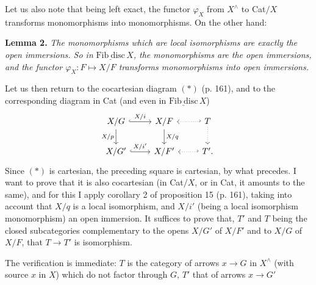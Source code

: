 \documentclass[11pt]{article}
\newcommand{\msp}[1]{\marginpar{\footnotesize [#1]}}
\newcommand{\Fibdisc}{\underline{\mathrm{Fib\ disc}}}
\begin{document}
\msp{page 165}
Let us also note that being left exact, the functor $\varphi_X$ from $X^{\wedge}$ to Cat$/X$ transforms monomorphisms into monomorphisms. On the other hand:

\textbf{Lemma 2.} \textit{The monomorphisms which are local isomorphisms are exactly the open immersions. So in} $\Fibdisc\, X$\textit{, the monomorphisms are the open immersions, and the functor $\varphi_X : F \longmapsto X/F$ transforms monomorphisms into open immersions.}

Let us then return to the cocartesian diagram $(*)$ (p. 161), and to the corresponding diagram in Cat (and even in $\Fibdisc\, X$)
\[
\begin{tikzcd}
X/G \ar[r, hook, "X/i"] \ar[d, "X/p"'] & X/F \ar[d, "X/q"] & T \ar[l, hook', dotted] \ar[d, dotted] \\
X/G' \ar[r, hook, "X/i'"] & X/F' & T'. \ar[l, hook', dotted]
\end{tikzcd}
\]
Since $(*)$ is cartesian, the preceding square is cartesian, by what precedes. I want to prove that it is also cocartesian
\msp{page 166}
(in Cat$/X$, or in Cat, it amounts to the same), and for this I apply corollary 2 of proposition 15 (p. 161), taking into account that $X/q$ is a local isomorphism, and $X/i'$ (being a local isomorphism monomorphism) an open immersion. It suffices to prove that, $T'$ and $T$ being the closed subcategories complementary to the opens $X/G'$ of $X/F'$ and to $X/G$ of $X/F$, that $T \longrightarrow T'$ is isomorphism.

{\small} %

The verification is immediate: $T$ is the category of arrows $x \longrightarrow G$ in $X^{\wedge}$ (with source $x$ in $X$) which do not factor through $G$, $T'$ that of arrows $x \longrightarrow G'$
\end{document}
